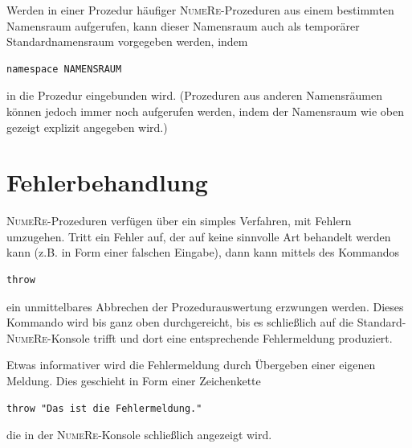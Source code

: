 \documentclass[DIV=14,headsepline,footsepline]{scrbook}
\newcommand{\NR}{\textsc{Nu\-me\-Re}}
\begin{document}
				Werden in einer Prozedur häufiger \NR-Prozeduren aus einem bestimmten Namensraum aufgerufen, kann dieser Namensraum auch als temporärer Standardnamensraum vorgegeben werden, indem
				\begin{lstlisting}
namespace NAMENSRAUM
				\end{lstlisting}
				in die Prozedur eingebunden wird. (Prozeduren aus anderen Namensräumen können jedoch immer noch aufgerufen werden, indem der Namensraum wie oben gezeigt explizit angegeben wird.)
			\section{Fehlerbehandlung}
				\NR-Prozeduren verfügen über ein simples Verfahren, mit Fehlern umzugehen. Tritt ein Fehler auf, der auf keine sinnvolle Art behandelt werden kann (z.B. in Form einer falschen Eingabe), dann kann mittels des Kommandos
				\begin{lstlisting}
throw
				\end{lstlisting}
				ein unmittelbares Abbrechen der Prozedurauswertung erzwungen werden. Dieses Kommando wird bis ganz oben durchgereicht, bis es schließlich auf die Standard-\NR-Konsole trifft und dort eine entsprechende Fehlermeldung produziert.
				
				Etwas informativer wird die Fehlermeldung durch Übergeben einer eigenen Meldung. Dies geschieht in Form einer Zeichenkette
				\begin{lstlisting}
throw "Das ist die Fehlermeldung."
				\end{lstlisting}
				die in der \NR-Konsole schließlich angezeigt wird.
\end{document}
